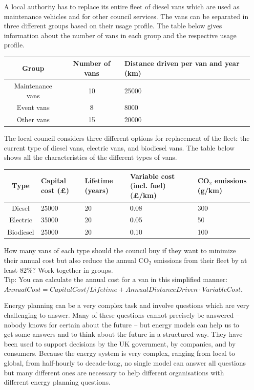 \begin{kaobox}[frametitle=Task]
A local authority has to replace its entire fleet of diesel vans which are used as maintenance vehicles and for other council services. The vans can be separated in three different groups based on their usage profile. The table below  gives information about the number of vans in each group and the respective usage profile.


\begin{tabular}{ c c m{4cm} }
	\toprule
	Group & Number of vans & Distance driven per van and year (km)\\
	\midrule
	Maintenance vans & 10 & 25000\\
	Event vans & 8 & 8000 \\ 
	Other vans & 15 &20000  \\
	\bottomrule
\end{tabular}


The local council considers three different options for replacement of the fleet: the current type of diesel vans, electric vans, and biodiesel vans. The table below shows all the characteristics of the different types of vans.

\begin{tabular}{ c m{1.5cm} m{1.5cm} m{2cm} m{2cm} }
	\toprule
	Type & Capital cost (\pounds) & Lifetime (years) & Variable cost (incl. fuel) (\pounds /km)& CO$_2$ emissions (g/km)\\
	\midrule
	Diesel & 25000 & 20 &  0.08 & 300\\
	Electric & 35000 &  20 &  0.05 & 50 \\ 
	Biodiesel & 25000 & 20 &  0.10 & 100\\
	\bottomrule
\end{tabular}

How many vans of each type should the council buy if they want to minimize their annual cost but also reduce the annual CO$_{2}$ emissions from their fleet by at least 82\%? Work together in groups.\\
Tip: You can calculate the annual cost for a van in this simplified manner:\\
$ AnnualCost = CapitalCost/Lifetime + AnnualDistanceDriven \cdot VariableCost$.
\end{kaobox}

Energy planning can be a very complex task and involve questions which are very challenging to answer. Many of these questions cannot precisely be answered -- nobody knows for certain about the future -- but energy models can help us to get some answers and to think about the future in a structured way. They have been used to support decisions by the UK government, by companies, and by consumers. Because the energy system is very complex, ranging from local to global, from half-hourly to decade-long, no single model can answer all questions but many different ones are necessary to help different organisations with different energy planning questions.

